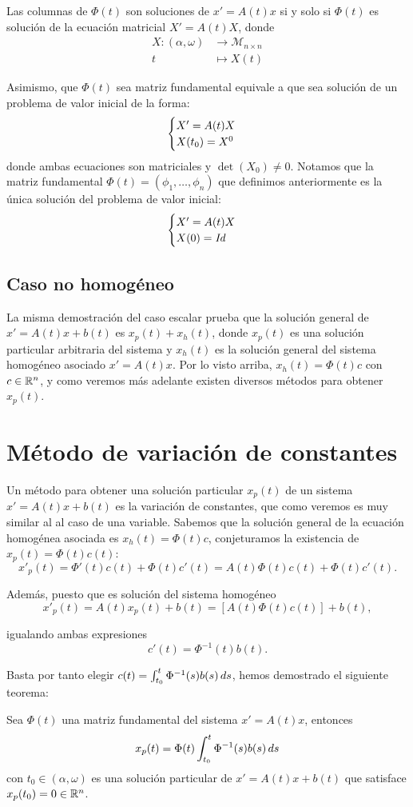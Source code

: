 \documentclass[../ecuaciones_diferenciales.tex]{subfiles}
\begin{document}
Las columnas de \(\Phi(t)\) son soluciones de \(x' = A(t)x\) si y solo si
\(\Phi(t)\) es solución de la ecuación matricial \(X' = A(t)X\), donde
\begin{align*}
	X : (\alpha, \omega) & \to \mathcal{M}_{n \times n} \\
	t                    & \mapsto X(t)
\end{align*}

Asimismo, que \(\Phi(t)\) sea matriz fundamental equivale a que sea solución de
un problema de valor inicial de la forma:
\[\begin{cases}
		X' = A(t)X \\
		X(t_0) = X^0\end{cases}\]
donde ambas ecuaciones son matriciales y \(\det(X_0) \neq 0\). Notamos que la
matriz fundamental \(\Phi(t) = (\phi_1, \dots, \phi_n)\) que definimos
anteriormente es la única solución del problema de valor inicial:
\[\begin{cases}
		X' = A(t)X \\
		X(0) = \mathit{Id}\end{cases}\]

\subsection{Caso no homogéneo}

La misma demostración del caso escalar prueba que la solución general de
\(x' = A(t)x + b(t)\) es \(x_p(t) + x_h(t)\), donde \(x_p(t)\) es una solución
particular arbitraria del sistema y \(x_h(t)\) es la solución general del
sistema homogéneo asociado \(x' = A(t)x\). Por lo visto arriba,
\(x_h(t) = \Phi(t)c\) con \(c \in \mathbb{R}^n\), y como veremos más adelante existen
diversos métodos para obtener \(x_p(t)\).

\section{Método de variación de constantes}

Un método para obtener una solución particular \(x_p(t)\) de un sistema
\(x' = A(t)x + b(t)\) es la variación de constantes, que como veremos es muy
similar al al caso de una variable. Sabemos que la solución general de la
ecuación homogénea asociada es \(x_h(t) = \Phi(t)c\), conjeturamos la existencia
de \(x_p(t) = \Phi(t) c(t)\):
\[x'_p(t) = \Phi'(t) c(t) + \Phi(t) c'(t) = A(t )\Phi(t) c(t) + \Phi(t) c'(t).\]

Además, puesto que es solución del sistema homogéneo
\[x'_p(t) = A(t)x_p(t) + b(t) = [A(t) \Phi(t) c(t)] + b(t),\]

igualando ambas expresiones
\[c'(t) = \Phi^{-1}(t) b(t).\]

Basta por tanto elegir \(c(t) = \int_{t_0}^t \Phi^{-1}(s) b(s) \mathop{d\!} s\), hemos
demostrado el siguiente teorema:

\begin{theorem}
	Sea \(\Phi(t)\) una matriz fundamental del sistema \(x' = A(t)x\), entonces
	\[x_p(t) = \Phi(t) \int_{t_0}^t \Phi^{-1}(s) b(s) \mathop{d\!} s\]
	con \(t_0 \in (\alpha, \omega)\) es una solución particular de
	\(x' = A(t)x + b(t)\) que satisface \(x_p(t_0) = 0 \in \mathbb{R}^n\).
\end{theorem}
\end{document}
